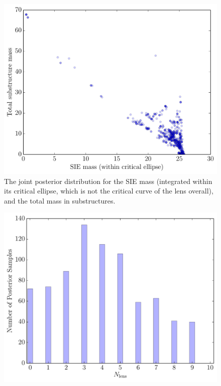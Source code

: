 \documentclass[useAMS,usenatbib]{mn2e}
\begin{document}
\begin{figure}
\begin{center}
\includegraphics[scale=0.4]{masses2.pdf}
\caption{The joint posterior distribution for the SIE mass (integrated within
its critical ellipse, which is not the critical curve of the lens overall),
and the total mass in substructures.\label{fig:simdata_masses}}
\end{center}
\end{figure}

\begin{figure}
\begin{center}
\includegraphics[scale=0.4]{N_lens2.pdf}
\caption{\label{fig:N_lens2}}
\end{center}
\end{figure}
\end{document}
